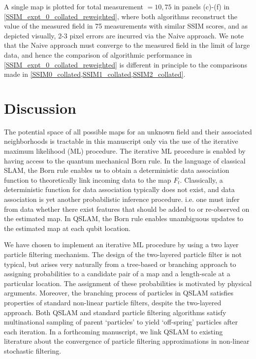 A single map is plotted for total measurement $=10, 75$ in panels (c)-(f) in \cref{SSIM_expt_0_collated_reweighted}, where both algorithms reconstruct the value of the measured field in 75 measurements with similar SSIM scores, and as depicted visually, 2-3 pixel errors are incurred via the Naive approach. We note that the Naive approach must converge to the measured field in the limit of large data, and hence the comparison of algorithmic performance in  \cref{SSIM_expt_0_collated_reweighted} is  different in principle to the comparisons made in \cref{SSIM0_collated,SSIM1_collated,SSIM2_collated}.

\section{Discussion \label{sec:discussion}}
The potential space of all possible maps for an unknown field and their associated neighborhoods is tractable in this manuscript only via the use of the iterative maximum likelihood (ML) procedure. The iterative ML procedure is enabled by having access to the quantum mechanical Born rule. In the language of classical SLAM, the Born rule enables us to obtain a deterministic data association function to theoretically link incoming data to the map $F_t$. Classically, a deterministic function for data association typically does not exist, and data association is yet another probabilistic inference procedure. i.e. one must infer from data whether there exist features that should be added to or re-observed on the estimated map. In QSLAM, the Born rule enables unambiguous updates to the estimated map at each qubit location. 

We have chosen to implement an iterative ML procedure by using a two layer particle filtering mechanism. The design of the two-layered particle filter is not typical, but arises very naturally from a tree-based or branching approach to assigning probabilities to a candidate pair of a map and a length-scale at a particular location. The assignment of these probabilities is motivated by physical arguments. Moreover, the branching process of particles in QSLAM satisfies properties of standard non-linear particle filters, despite the two-layered approach. Both QSLAM and standard particle filtering algorithms satisfy multinational sampling of parent `particles' to yield `off-spring' particles after each iteration. In a forthcoming manuscript, we link QSLAM to existing literature about the convergence of particle filtering approximations in non-linear stochastic filtering.

